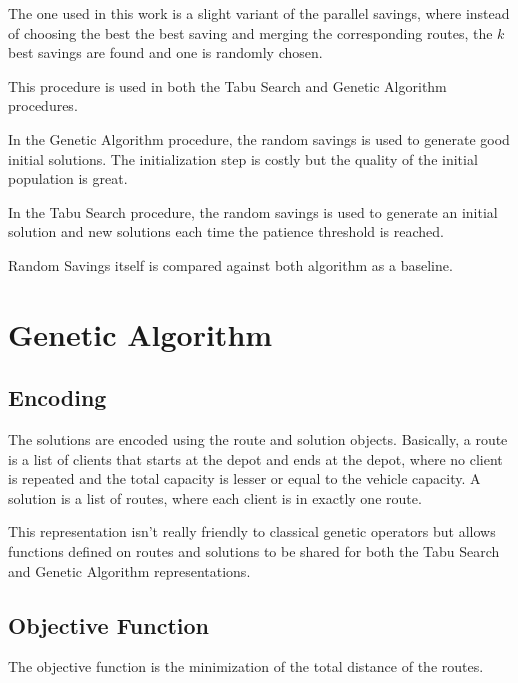 \documentclass{article} %
\begin{document}
{The one used in this work is a slight variant of the parallel savings, where instead of choosing the best the best saving and merging the corresponding routes, the $k$ best savings are found and one is randomly chosen.\newline

This procedure is used in both the Tabu Search and Genetic Algorithm procedures.\newline

In the Genetic Algorithm procedure, the random savings is used to generate good initial solutions. The initialization step is costly but the quality of the initial population is great.\newline

In the Tabu Search procedure, the random savings is used to generate an initial solution and new solutions each time the patience threshold is reached.\newline

Random Savings itself is compared against both algorithm as a baseline.


\newpage
\section{Genetic Algorithm}
\label{genetic_algorithm}

\subsection{Encoding}

The solutions are encoded using the route and solution objects. Basically, a route is a list of clients that starts at the depot and ends at the depot, where no client is repeated and the total capacity is lesser or equal to the vehicle capacity. A solution is a list of routes, where each client is in exactly one route.\newline

This representation isn't really friendly to classical genetic operators but allows functions defined on routes and solutions to be shared for both the Tabu Search and Genetic Algorithm representations.

\subsection{Objective Function}

The objective function is the minimization of the total distance of the routes.

}
\end{document}

